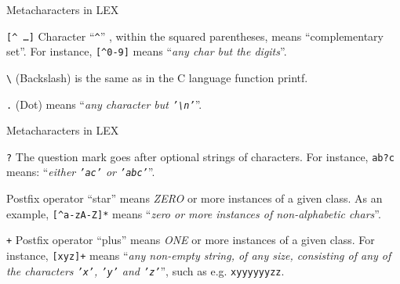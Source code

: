 \begin{frame}[fragile]{Metacharacters in LEX}
\begin{description}
\item{\tt [\verb"^" \ldots ]} 
Character ``{\tt \verb"^"}'' , within the squared parentheses, means
``complementary set''.
For instance, {\tt [\verb"^"0-9]} means
        ``{\em any char but the digits\/}''.

\item{\tt \verb"\"}
	(Backslash) is the same as in the C language function
	printf.

\item{\tt .}
        (Dot) means ``{\em any character but
        {\tt '\verb"\n"'}}''.
\end{description}


\end{frame}
\begin{frame}[fragile]{Metacharacters in LEX}

\begin{description}
\item{\tt ?} The question mark goes after optional strings of
characters.
For instance, {\tt ab?c} means:
``{\em either {\tt 'ac'} or {\tt 'abc'}}''.

\item{\tt *} Postfix operator ``star'' means \emph{ZERO\/} or more
instances of a given class.
As an example, {\tt [\verb"^"a-zA-Z]*} means ``{\em zero or more
instances of non-alphabetic chars\/}''.

\item{\tt +} Postfix operator ``plus'' means \emph{ONE\/} or more
instances of a given class.
For instance,
{\tt [xyz]+} means ``{\em any non-empty string, of any size, 
consisting of any of the characters
{\tt 'x'}, {\tt 'y'} and {\tt 'z'}}'', such as e.g.
{\tt xyyyyyyzz}.
\end{description}


\end{frame}
